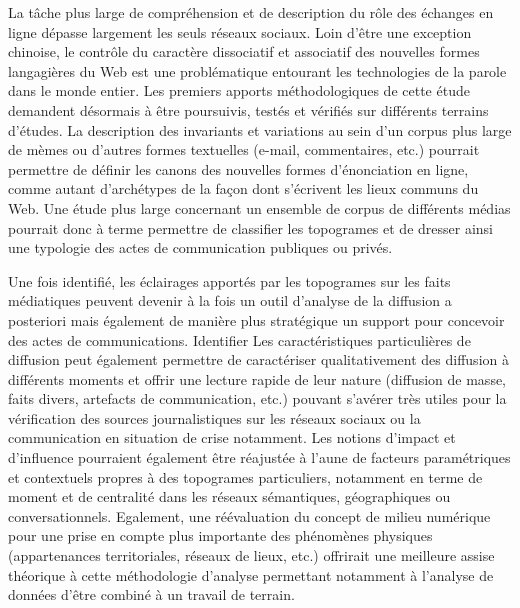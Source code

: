 La t\^ache plus large de compréhension et de description du r\^ole des échanges en ligne dépasse largement les seuls réseaux sociaux. Loin d{\textquoteright}être une exception chinoise, le contr\^ole du caractère dissociatif et associatif des nouvelles formes langagières du Web est une problématique entourant les technologies de la parole dans le monde entier. Les premiers apports méthodologiques de cette étude demandent désormais à être poursuivis, testés et vérifiés sur différents terrains d{\textquoteright}études. La description des invariants et variations au sein d{\textquoteright}un corpus plus large de mèmes ou d{\textquoteright}autres formes textuelles (e-mail, commentaires, etc.) pourrait permettre de définir les canons des nouvelles formes d{\textquoteright}énonciation en ligne, comme autant d{\textquoteright}archétypes de la fa\c{c}on dont s{\textquoteright}écrivent les lieux communs du Web. Une étude plus large concernant un ensemble de corpus de différents médias pourrait donc à terme permettre de classifier les topogrames et de dresser ainsi une typologie des actes de communication publiques ou privés. 

Une fois identifié, les éclairages apportés par les topogrames sur les faits médiatiques peuvent devenir à la fois un outil d{\textquoteright}analyse de la diffusion a posteriori mais également de manière plus stratégique un support pour concevoir des actes de communications. Identifier Les caractéristiques particulières de diffusion peut également permettre de caractériser qualitativement des diffusion à différents moments et offrir une lecture rapide de leur nature (diffusion de masse, faits divers, artefacts de communication, etc.) pouvant s{\textquoteright}avérer très utiles pour la vérification des sources journalistiques sur les réseaux sociaux ou la communication en situation de crise notamment. Les notions d{\textquoteright}impact et d{\textquoteright}influence pourraient également être réajustée à l{\textquoteright}aune de facteurs paramétriques et contextuels propres à des topogrames particuliers, notamment en terme de moment et de centralité dans les réseaux sémantiques, géographiques ou conversationnels. Egalement, une réévaluation du concept de milieu numérique pour une prise en compte plus importante des phénomènes physiques (appartenances territoriales, réseaux de lieux, etc.) offrirait une meilleure assise théorique à cette méthodologie d{\textquoteright}analyse permettant notamment à l{\textquoteright}analyse de données d{\textquoteright}être combiné à un travail de terrain. 

